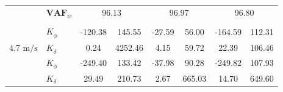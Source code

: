 \begin{table}[]
\begin{tabular}{llcccccc}
                                                   & $\mathbf{VAF}_\psi$                                    & \multicolumn{2}{c}{96.13}                                                                          & \multicolumn{2}{c}{96.97}                                                                          & \multicolumn{2}{c}{96.80}                                                                          \\
                                                   &                                                        & \multicolumn{1}{l}{}                        & \multicolumn{1}{l}{}                                 & \multicolumn{1}{l}{}                        & \multicolumn{1}{l}{}                                 & \multicolumn{1}{l}{}                        & \multicolumn{1}{l}{}                                 \\ \hline
                                                   & $K_{\dot{\phi}} $                                      & -120.38                                     & 145.55                                               & -27.59                                      & 56.00                                                & -164.59                                     & 112.31                                               \\
    \multirow{-2}{*}{4.7 $\si{\meter\per\second}$} & $K_{\dot{\delta}}$                                     & 0.24                                        & 4252.46                                              & 4.15                                        & 59.72                                                & 22.39                                       & 106.46                                               \\
                                                   & $K_{\phi} $                                            & -249.40                                     & 133.42                                               & -37.98                                      & 90.28                                                & -249.82                                     & 107.93                                               \\
                                                   & $K_\delta $                                            & 29.49                                       & 210.73                                               & 2.67                                        & 665.03                                               & 14.70                                       & 649.60                                               \\

\end{tabular}
\end{table}

